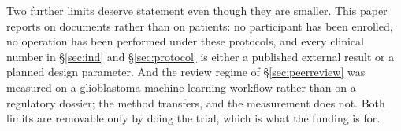 Two further limits deserve statement even though they are smaller. This paper
reports on documents rather than on patients: no participant has been enrolled,
no operation has been performed under these protocols, and every clinical number
in \S\ref{sec:ind} and \S\ref{sec:protocol} is either a published external
result or a planned design parameter. And the review regime of
\S\ref{sec:peerreview} was measured on a glioblastoma machine learning workflow
rather than on a regulatory dossier; the method transfers, and the measurement
does not. Both limits are removable only by doing the trial, which is what the
funding is for.

